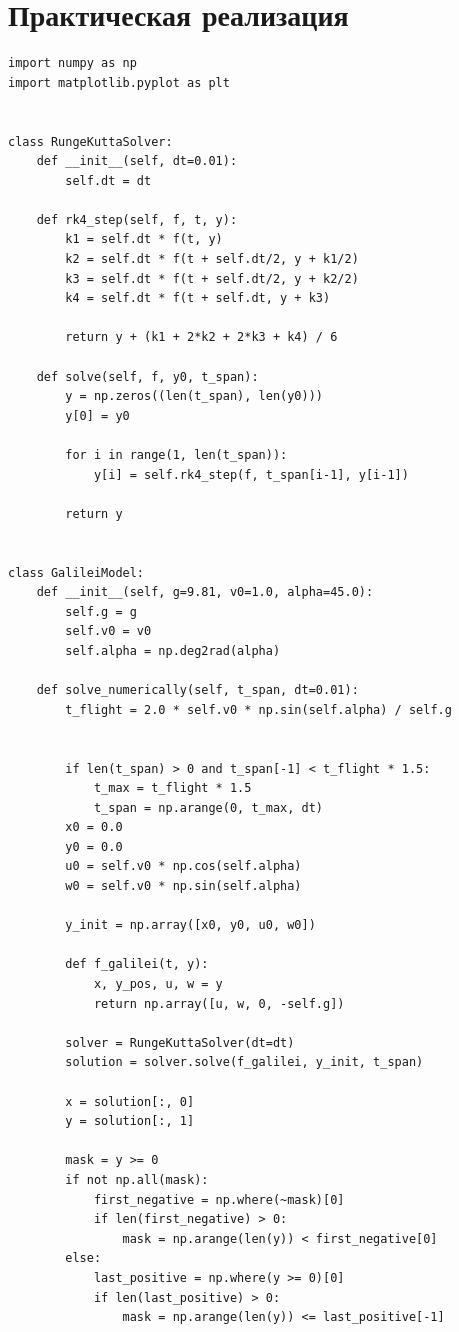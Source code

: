 \documentclass[a4paper, 14pt]{extarticle}
\begin{document}
\section{Практическая реализация}
\newenvironment{longlisting}{\captionsetup{type=listing}}{}
\begin{longlisting}
\caption{Модель Галилея и Ньютона}
\begin{verbatim}
import numpy as np
import matplotlib.pyplot as plt


class RungeKuttaSolver:
    def __init__(self, dt=0.01):
        self.dt = dt
    
    def rk4_step(self, f, t, y):
        k1 = self.dt * f(t, y)
        k2 = self.dt * f(t + self.dt/2, y + k1/2)
        k3 = self.dt * f(t + self.dt/2, y + k2/2)
        k4 = self.dt * f(t + self.dt, y + k3)
        
        return y + (k1 + 2*k2 + 2*k3 + k4) / 6
    
    def solve(self, f, y0, t_span):
        y = np.zeros((len(t_span), len(y0)))
        y[0] = y0
        
        for i in range(1, len(t_span)):
            y[i] = self.rk4_step(f, t_span[i-1], y[i-1])
            
        return y


class GalileiModel:
    def __init__(self, g=9.81, v0=1.0, alpha=45.0):
        self.g = g
        self.v0 = v0
        self.alpha = np.deg2rad(alpha)
    
    def solve_numerically(self, t_span, dt=0.01):
        t_flight = 2.0 * self.v0 * np.sin(self.alpha) / self.g
        

        if len(t_span) > 0 and t_span[-1] < t_flight * 1.5:
            t_max = t_flight * 1.5
            t_span = np.arange(0, t_max, dt)
        x0 = 0.0
        y0 = 0.0
        u0 = self.v0 * np.cos(self.alpha)
        w0 = self.v0 * np.sin(self.alpha)
        
        y_init = np.array([x0, y0, u0, w0])
        
        def f_galilei(t, y):
            x, y_pos, u, w = y
            return np.array([u, w, 0, -self.g])
        
        solver = RungeKuttaSolver(dt=dt)
        solution = solver.solve(f_galilei, y_init, t_span)
        
        x = solution[:, 0]
        y = solution[:, 1]

        mask = y >= 0
        if not np.all(mask):
            first_negative = np.where(~mask)[0]
            if len(first_negative) > 0:
                mask = np.arange(len(y)) < first_negative[0]
        else:
            last_positive = np.where(y >= 0)[0]
            if len(last_positive) > 0:
                mask = np.arange(len(y)) <= last_positive[-1]
        

\end{verbatim}
\end{longlisting}
\end{document}
